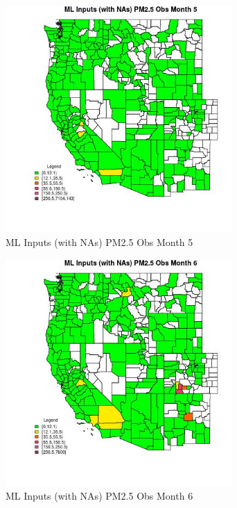 \begin{figure} 
\centering  
\includegraphics[width=0.77\textwidth]{Code_Outputs/Report_ML_input_PM25_Step4_part_f_de_duplicated_aveswNAs_CountyPM25_ObsmedianMonth5.jpg} 
\caption{\label{fig:Report_ML_input_PM25_Step4_part_f_de_duplicated_aveswNAsCountyPM25_ObsmedianMonth5}ML Inputs (with NAs) PM2.5 Obs Month 5} 
\end{figure} 
 

\begin{figure} 
\centering  
\includegraphics[width=0.77\textwidth]{Code_Outputs/Report_ML_input_PM25_Step4_part_f_de_duplicated_aveswNAs_CountyPM25_ObsmedianMonth6.jpg} 
\caption{\label{fig:Report_ML_input_PM25_Step4_part_f_de_duplicated_aveswNAsCountyPM25_ObsmedianMonth6}ML Inputs (with NAs) PM2.5 Obs Month 6} 
\end{figure} 
 

